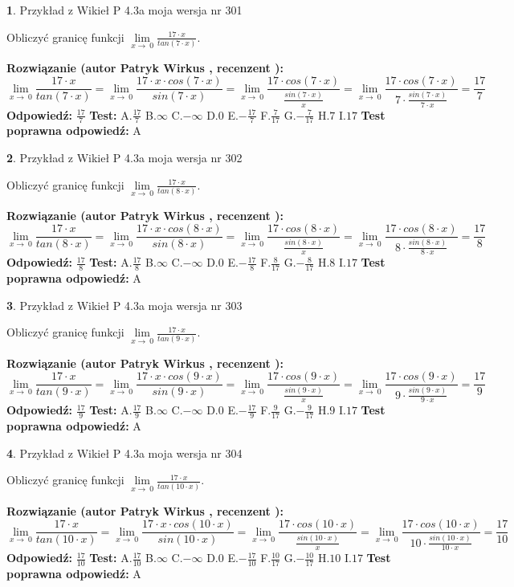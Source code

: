 \documentclass[12pt, a4paper]{article}
\theoremstyle{definition} %
\newtheorem{zad}{}
\newcommand{\zadStart}[1]{\begin{zad}#1\newline}
\newcommand{\zadStop}{\end{zad}}
\newcommand{\rozwStart}[2]{\noindent \textbf{Rozwiązanie (autor #1 , recenzent #2): }\newline}
\newcommand{\rozwStop}{\newline}
\newcommand{\odpStart}{\noindent \textbf{Odpowiedź:}\newline}
\newcommand{\odpStop}{\newline}
\newcommand{\testStart}{\noindent \textbf{Test:}\newline}
\newcommand{\testStop}{\newline}
\newcommand{\kluczStart}{\noindent \textbf{Test poprawna odpowiedź:}\newline}
\newcommand{\kluczStop}{\newline}
\begin{document}
\zadStart{Przykład z Wikieł P 4.3a moja wersja nr 301}


Obliczyć granicę funkcji $\lim\limits_{x\to\ 0}\frac{17 \cdot x}{tan(7 \cdot x)}$.
\zadStop
\rozwStart{Patryk Wirkus}{}
$$\lim\limits_{x\to\ 0}\frac{17 \cdot x}{tan(7 \cdot x)}=\lim\limits_{x\to\ 0}\frac{17 \cdot x \cdot cos(7 \cdot x)}{sin(7 \cdot x)}=\lim\limits_{x\to\ 0}\frac{17 \cdot cos(7 \cdot x)}{\frac{sin(7 \cdot x)}{x}}=\lim\limits_{x\to\ 0}\frac{17 \cdot cos(7 \cdot x)}{7 \cdot \frac{sin(7 \cdot x)}{7 \cdot x}} = \frac{17}{7}$$
\rozwStop
\odpStart
$\frac{17}{7}$
\odpStop
\testStart
A.$\frac{17}{7}$
B.$\infty$
C.$-\infty$
D.$0$
E.$-\frac{17}{7}$
F.$\frac{7}{17}$
G.$-\frac{7}{17}$
H.$7$
I.$17$
\testStop
\kluczStart
A
\kluczStop



\zadStart{Przykład z Wikieł P 4.3a moja wersja nr 302}


Obliczyć granicę funkcji $\lim\limits_{x\to\ 0}\frac{17 \cdot x}{tan(8 \cdot x)}$.
\zadStop
\rozwStart{Patryk Wirkus}{}
$$\lim\limits_{x\to\ 0}\frac{17 \cdot x}{tan(8 \cdot x)}=\lim\limits_{x\to\ 0}\frac{17 \cdot x \cdot cos(8 \cdot x)}{sin(8 \cdot x)}=\lim\limits_{x\to\ 0}\frac{17 \cdot cos(8 \cdot x)}{\frac{sin(8 \cdot x)}{x}}=\lim\limits_{x\to\ 0}\frac{17 \cdot cos(8 \cdot x)}{8 \cdot \frac{sin(8 \cdot x)}{8 \cdot x}} = \frac{17}{8}$$
\rozwStop
\odpStart
$\frac{17}{8}$
\odpStop
\testStart
A.$\frac{17}{8}$
B.$\infty$
C.$-\infty$
D.$0$
E.$-\frac{17}{8}$
F.$\frac{8}{17}$
G.$-\frac{8}{17}$
H.$8$
I.$17$
\testStop
\kluczStart
A
\kluczStop



\zadStart{Przykład z Wikieł P 4.3a moja wersja nr 303}


Obliczyć granicę funkcji $\lim\limits_{x\to\ 0}\frac{17 \cdot x}{tan(9 \cdot x)}$.
\zadStop
\rozwStart{Patryk Wirkus}{}
$$\lim\limits_{x\to\ 0}\frac{17 \cdot x}{tan(9 \cdot x)}=\lim\limits_{x\to\ 0}\frac{17 \cdot x \cdot cos(9 \cdot x)}{sin(9 \cdot x)}=\lim\limits_{x\to\ 0}\frac{17 \cdot cos(9 \cdot x)}{\frac{sin(9 \cdot x)}{x}}=\lim\limits_{x\to\ 0}\frac{17 \cdot cos(9 \cdot x)}{9 \cdot \frac{sin(9 \cdot x)}{9 \cdot x}} = \frac{17}{9}$$
\rozwStop
\odpStart
$\frac{17}{9}$
\odpStop
\testStart
A.$\frac{17}{9}$
B.$\infty$
C.$-\infty$
D.$0$
E.$-\frac{17}{9}$
F.$\frac{9}{17}$
G.$-\frac{9}{17}$
H.$9$
I.$17$
\testStop
\kluczStart
A
\kluczStop



\zadStart{Przykład z Wikieł P 4.3a moja wersja nr 304}


Obliczyć granicę funkcji $\lim\limits_{x\to\ 0}\frac{17 \cdot x}{tan(10 \cdot x)}$.
\zadStop
\rozwStart{Patryk Wirkus}{}
$$\lim\limits_{x\to\ 0}\frac{17 \cdot x}{tan(10 \cdot x)}=\lim\limits_{x\to\ 0}\frac{17 \cdot x \cdot cos(10 \cdot x)}{sin(10 \cdot x)}=\lim\limits_{x\to\ 0}\frac{17 \cdot cos(10 \cdot x)}{\frac{sin(10 \cdot x)}{x}}=\lim\limits_{x\to\ 0}\frac{17 \cdot cos(10 \cdot x)}{10 \cdot \frac{sin(10 \cdot x)}{10 \cdot x}} = \frac{17}{10}$$
\rozwStop
\odpStart
$\frac{17}{10}$
\odpStop
\testStart
A.$\frac{17}{10}$
B.$\infty$
C.$-\infty$
D.$0$
E.$-\frac{17}{10}$
F.$\frac{10}{17}$
G.$-\frac{10}{17}$
H.$10$
I.$17$
\testStop
\kluczStart
A
\kluczStop
\end{document}
